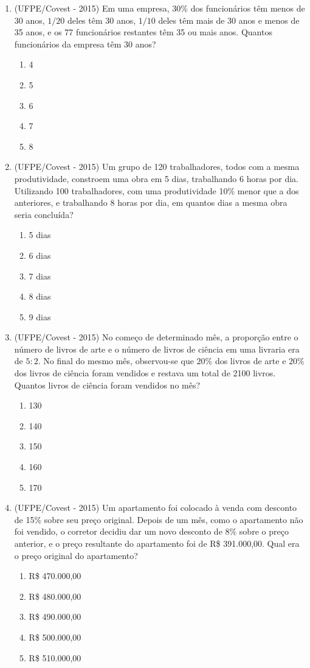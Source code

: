 \begin{enumerate}
 \item (UFPE/Covest - 2015) Em uma empresa, 30\% dos funcionários têm menos de 30 anos, $1/20$ deles têm 30 anos, $1/10$ deles têm mais de 30 anos e menos de 35 anos, e os 77 funcionários restantes têm 35 ou mais anos. Quantos funcionários da empresa têm 30 anos?
 \begin{enumerate}
 \item 4
 \item 5
 \item 6
 \item 7
 \item 8
 \end{enumerate}
 
 \item (UFPE/Covest - 2015) Um grupo de 120 trabalhadores, todos com a mesma produtividade, constroem uma obra em 5 dias, trabalhando 6 horas por dia. Utilizando 100 trabalhadores, com uma produtividade 10\% menor que a dos anteriores, e trabalhando 8 horas por dia, em quantos dias a mesma obra seria concluída?
 \begin{enumerate}
 \item 5 dias
 \item 6 dias
 \item 7 dias
 \item 8 dias
 \item 9 dias
 \end{enumerate}
 
 \item (UFPE/Covest - 2015) No começo de determinado mês, a proporção entre o número de livros de arte e o número de livros de ciência em uma livraria era de $5:2$. No final do mesmo mês, observou-se que $20\%$ dos livros de arte e $20\%$ dos livros de ciência foram vendidos e restava um total de 2100 livros. Quantos livros de ciência foram vendidos no mês?
 \begin{enumerate}
 \item 130
 \item 140
 \item 150
 \item 160
 \item 170
 \end{enumerate}
 
 \item (UFPE/Covest - 2015) Um apartamento foi colocado à venda com desconto de 15\% sobre seu preço original. Depois de um mês, como o apartamento não foi vendido, o corretor decidiu dar um novo desconto de 8\% sobre o preço anterior, e o preço resultante do apartamento foi de R\$ 391.000,00. Qual era o preço original do apartamento?
 \begin{enumerate}
 \item R\$ 470.000,00
 \item R\$ 480.000,00
 \item R\$ 490.000,00
 \item R\$ 500.000,00
 \item R\$ 510.000,00
 \end{enumerate}
 

\end{enumerate}
